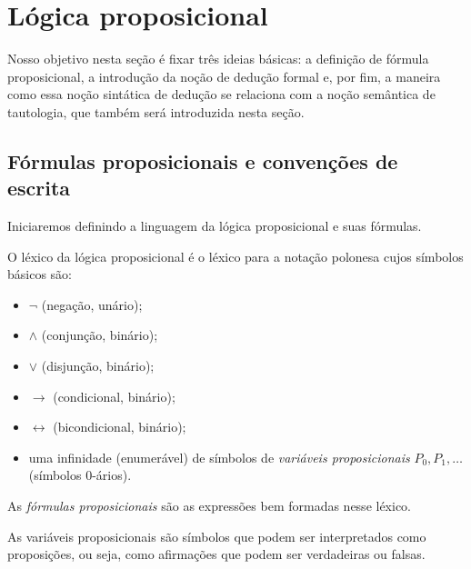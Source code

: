 \section{Lógica proposicional}\label{sec:logicaProposicional}
Nosso objetivo nesta seção é fixar três ideias básicas: a definição de fórmula proposicional, a introdução da noção de dedução formal e, por fim, a maneira como essa noção sintática de dedução se relaciona com a noção semântica de tautologia, que também será introduzida nesta seção.

\subsection{Fórmulas proposicionais e convenções de escrita}\label{subsec:formulasProposicionaisConvencoes}

Iniciaremos definindo a linguagem da lógica proposicional e suas fórmulas.

\begin{metadefinition}\label{mdef:formulasProposicionais}
    O léxico da lógica proposicional é o léxico para a notação polonesa cujos símbolos básicos são:
    \begin{itemize}
        \item $\neg$ (negação, unário);
        \item $\wedge$ (conjunção, binário);
        \item $\vee$ (disjunção, binário);
        \item $\rightarrow$ (condicional, binário);
        \item $\leftrightarrow$ (bicondicional, binário);
        \item uma infinidade (enumerável) de símbolos de \emph{variáveis proposicionais} $P_0, P_1, \dots$ (símbolos $0$-ários).
    \end{itemize}
    As \emph{fórmulas proposicionais} são as expressões bem formadas nesse léxico.
\end{metadefinition}

As variáveis proposicionais são símbolos que podem ser interpretados como proposições, ou seja, como afirmações que podem ser verdadeiras ou falsas.

